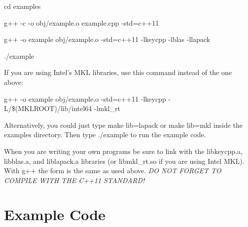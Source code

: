 {\ttfamily cd examples}

{\ttfamily g++ -\/c -\/o obj/example.\-o example.\-cpp -\/std=c++11}

{\ttfamily g++ -\/o example obj/example.\-o -\/std=c++11 -\/lkeycpp -\/lblas -\/llapack}

{\ttfamily ./example}

If you are using Intel's M\-K\-L libraries, use this command instead of the one above\-:

{\ttfamily g++ -\/o example obj/example.\-o -\/std=c++11 -\/lkeycpp -\/\-L/\$(M\-K\-L\-R\-O\-O\-T)/lib/intel64 -\/lmkl\-\_\-rt}

Alternatively, you could just type {\ttfamily make lib=lapack} or {\ttfamily make lib=mkl} inside the {\ttfamily examples} directory. Then type {\ttfamily ./example} to run the example code.

When you are writing your own programs be sure to link with the {\ttfamily libkeycpp.\-a}, {\ttfamily libblas.\-a}, and {\ttfamily liblapack.\-a} libraries (or {\ttfamily libmkl\-\_\-rt.\-so} if you are using Intel M\-K\-L). With {\ttfamily g++} the form is the same as used above. {\itshape D\-O N\-O\-T F\-O\-R\-G\-E\-T T\-O C\-O\-M\-P\-I\-L\-E W\-I\-T\-H T\-H\-E C++11 S\-T\-A\-N\-D\-A\-R\-D!}

\section*{Example Code}

